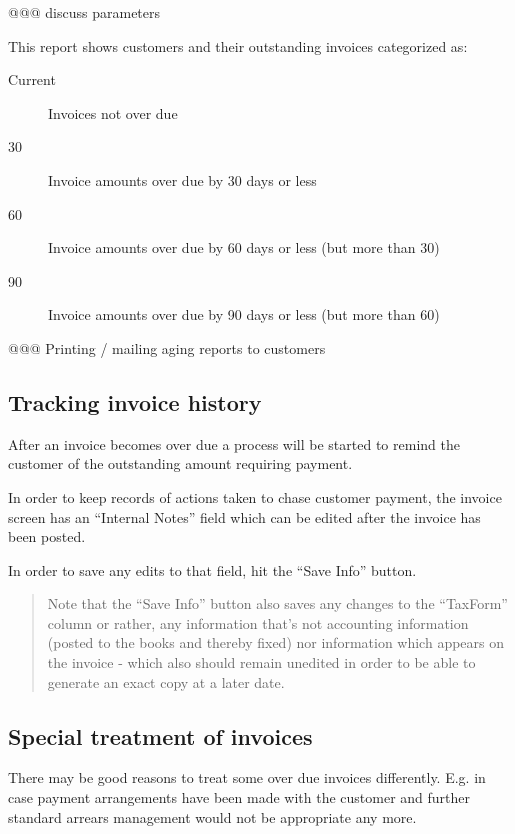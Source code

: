 @@@ discuss parameters

This report shows customers and their outstanding invoices categorized as:

\begin{description}
\item [Current] Invoices not over due
\item [30] Invoice amounts over due by 30 days or less
\item [60] Invoice amounts over due by 60 days or less (but more than 30)
\item [90] Invoice amounts over due by 90 days or less (but more than 60)
\end{description}


@@@ Printing / mailing aging reports to customers


\subsection{Tracking invoice history}
\label{subsec-business-processes-credit-risk-arrears-reminding}

After an invoice becomes over due a process will be started to remind
the \gls{customer} of the outstanding amount requiring payment.

In order to keep records of actions taken to chase customer payment,
the invoice screen has an ``Internal Notes'' field which can be edited
after the invoice has been posted.

In order to save any edits to that field, hit the ``Save Info'' button.

\begin{quote}
Note that the ``Save Info'' button also saves any changes to the ``TaxForm'' column or
rather, any information that's not accounting information (posted to the books and
thereby fixed) nor information which appears on the invoice - which also should remain
unedited in order to be able to generate an exact copy at a later date.
\end{quote}


\subsection{Special treatment of invoices}
\label{subsec-business-processes-credit-risk-arrears-special-treatment}

There may be good reasons to treat some over due invoices differently. E.g. in case
payment arrangements have been made with the \gls{customer} and further standard arrears
management would not be appropriate any more.

